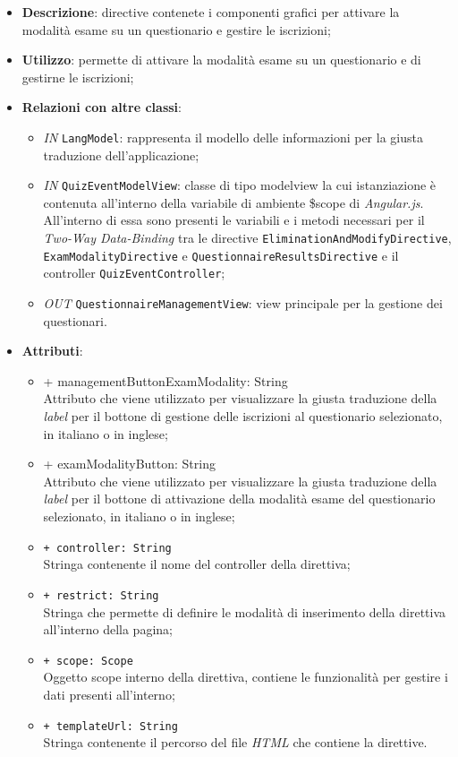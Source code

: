 \begin{itemize}
	\item \textbf{Descrizione}: directive contenete i componenti grafici per attivare la modalità esame su un questionario e gestire le iscrizioni;
	\item \textbf{Utilizzo}: permette di attivare la modalità esame su un questionario e di gestirne le iscrizioni;
	\item \textbf{Relazioni con altre classi}:
	\begin{itemize}

		\item \textit{IN} \texttt{LangModel}: rappresenta il modello delle informazioni per la giusta traduzione dell'applicazione;
		\item \textit{IN} \texttt{QuizEventModelView}: classe di tipo modelview la cui istanziazione è contenuta all'interno della variabile di ambiente \$scope di \textit{Angular.js}. All'interno di essa sono presenti le variabili e i metodi necessari per il \textit{Two-Way Data-Binding} tra le directive \texttt{EliminationAndModifyDirective}, \texttt{ExamModalityDirective} e \texttt{QuestionnaireResultsDirective} e il controller \texttt{QuizEventController};
		\item \textit{OUT} \texttt{QuestionnaireManagementView}: view principale per la gestione dei questionari.
	\end{itemize}
		\item \textbf{Attributi}:
		\begin{itemize}
			\item {+ managementButtonExamModality: String} \\ Attributo che viene utilizzato per visualizzare la giusta traduzione della \textit{label} per il bottone di gestione delle iscrizioni al questionario selezionato, in italiano o in inglese; 
			\item {+ examModalityButton: String} \\ Attributo che viene utilizzato per visualizzare la giusta traduzione della \textit{label} per il bottone di attivazione della modalità esame del questionario selezionato, in italiano o in inglese;
			\item \texttt{+ controller: String} \\ Stringa contenente il nome del controller della direttiva;
			\item \texttt{+ restrict: String} \\ Stringa che permette di definire le modalità di inserimento della direttiva all'interno della pagina;
			\item \texttt{+ scope: Scope} \\ Oggetto scope interno della direttiva, contiene le funzionalità per gestire i dati presenti all'interno;
			\item \texttt{+ templateUrl: String} \\ Stringa contenente il percorso del file \textit{HTML} che contiene la direttive.
		\end{itemize}
\end{itemize}